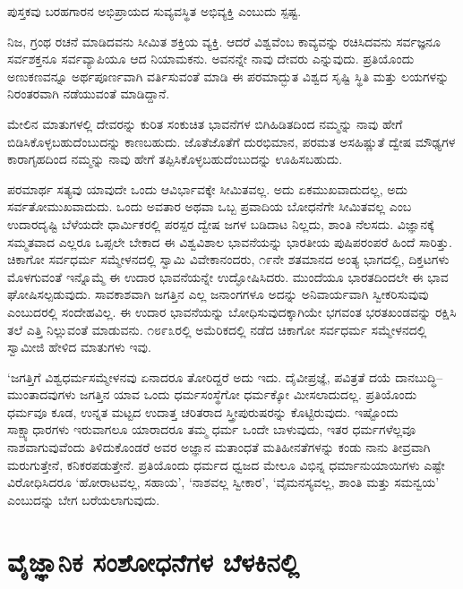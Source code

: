ಪುಸ್ತಕವು ಬರಹಗಾರನ ಅಭಿಪ್ರಾಯದ ಸುವ್ಯವಸ್ಥಿತ ಅಭಿವ್ಯಕ್ತಿ ಎಂಬುದು ಸ್ಪಷ್ಟ.

\newpage

ನಿಜ, ಗ್ರಂಥ ರಚನೆ ಮಾಡಿದವನು ಸೀಮಿತ ಶಕ್ತಿಯ ವ್ಯಕ್ತಿ. ಆದರೆ ವಿಶ್ವವೆಂಬ ಕಾವ್ಯವನ್ನು ರಚಿಸಿದವನು ಸರ್ವಜ್ಞನೂ ಸರ್ವಶಕ್ತನೂ ಸರ್ವವ್ಯಾಪಿಯೂ ಆದ ನಿಯಾಮಕನು. ಅವನನ್ನೇ ನಾವು ದೇವರು ಎನ್ನುವುದು. ಪ್ರತಿಯೊಂದು ಅಣುಕಣವನ್ನೂ ಅರ್ಥಪೂರ್ಣವಾಗಿ ವರ್ತಿಸುವಂತೆ ಮಾಡಿ ಈ ಪರಮಾದ್ಭುತ ವಿಶ್ವದ ಸೃಷ್ಟಿ ಸ್ಥಿತಿ ಮತ್ತು ಲಯಗಳನ್ನು ನಿರಂತರವಾಗಿ ನಡೆಯುವಂತೆ ಮಾಡಿದ್ದಾನೆ.

ಮೇಲಿನ ಮಾತುಗಳಲ್ಲಿ ದೇವರನ್ನು ಕುರಿತ ಸಂಕುಚಿತ ಭಾವನೆಗಳ ಬಿಗಿಹಿಡಿತದಿಂದ ನಮ್ಮನ್ನು ನಾವು ಹೇಗೆ ಬಿಡಿಸಿಕೊಳ್ಳಬಹುದೆಂಬುದನ್ನು ಕಾಣಬಹುದು. ಜೊತೆಜೊತೆಗೆ ದುರಭಿಮಾನ, ಪರಮತ ಅಸಹಿಷ್ಣುತೆ ದ್ವೇಷ ಮೌಢ್ಯಗಳ ಕಾರಾಗೃಹದಿಂದ ನಮ್ಮನ್ನು ನಾವು ಹೇಗೆ ತಪ್ಪಿಸಿಕೊಳ್ಳ\-ಬಹುದೆಂಬುದನ್ನು ಊಹಿಸಬಹುದು.

ಪರಮಾರ್ಥ ಸತ್ಯವು ಯಾವುದೇ ಒಂದು ಆವಿರ್ಭಾವಕ್ಕೇ ಸೀಮಿತವಲ್ಲ. ಅದು ಏಕಮುಖ\-ವಾದುದಲ್ಲ, ಅದು ಸರ್ವತೋಮುಖವಾದುದು. ಒಂದು ಅವತಾರ ಅಥವಾ ಒಬ್ಬ ಪ್ರವಾದಿಯ ಬೋಧನೆಗೇ ಸೀಮಿತವಲ್ಲ ಎಂಬ ಉದಾರದೃಷ್ಟಿ ಬೆಳೆಯದೇ ಧಾರ್ಮಿಕರಲ್ಲಿ ಪರಸ್ಪರ ದ್ವೇಷ ಜಗಳ ಬಡಿದಾಟ ನಿಲ್ಲದು, ಶಾಂತಿ ನೆಲಸದು. ವಿಜ್ಞಾನಕ್ಕೆ ಸಮ್ಮತವಾದ ಎಲ್ಲರೂ ಒಪ್ಪಲೇ ಬೇಕಾದ ಈ ವಿಶ್ವವಿಶಾಲ ಭಾವನೆಯನ್ನು ಭಾರತೀಯ ಪುಷಿಪರಂಪರೆ ಹಿಂದೆ ಸಾರಿತ್ತು. ಚಿಕಾಗೋ ಸರ್ವಧರ್ಮ ಸಮ್ಮೇಳನದಲ್ಲಿ ಸ್ವಾಮಿ ವಿವೇಕಾನಂದರು, ೧೯ನೇ ಶತಮಾನದ ಅಂತ್ಯ ಭಾಗದಲ್ಲಿ, ದಿಕ್ತಟಗಳು ಮೊಳಗುವಂತೆ ಇನ್ನೊಮ್ಮೆ ಈ ಉದಾರ ಭಾವನೆಯನ್ನೇ ಉದ್ಘೋಷಿಸಿದರು. ಮುಂದೆಯೂ ಭಾರತದಿಂದಲೇ ಈ ಭಾವ ಘೋಷಿಸಲ್ಪಡುವುದು. ಸಾವಕಾಶವಾಗಿ ಜಗತ್ತಿನ ಎಲ್ಲ ಜನಾಂಗಗಳೂ ಅದನ್ನು ಅನಿವಾರ್ಯವಾಗಿ ಸ್ವೀಕರಿಸುವುವು ಎಂಬುದರಲ್ಲಿ ಸಂದೇಹವಿಲ್ಲ. ಈ ಉದಾರ ಭಾವನೆಯನ್ನು ಬೋಧಿಸುವುದಕ್ಕಾಗಿಯೇ ಭಗವಂತ ಭರತಖಂಡವನ್ನು ರಕ್ಷಿಸಿ ತಲೆ ಎತ್ತಿ ನಿಲ್ಲುವಂತೆ ಮಾಡುವನು. ೧೮೯೩ರಲ್ಲಿ ಅಮೆರಿಕದಲ್ಲಿ ನಡೆದ ಚಿಕಾಗೋ ಸರ್ವಧರ್ಮ ಸಮ್ಮೇಳನದಲ್ಲಿ ಸ್ವಾಮೀಜಿ ಹೇಳಿದ ಮಾತುಗಳು ಇವು.

‘ಜಗತ್ತಿಗೆ ವಿಶ್ವಧರ್ಮಸಮ್ಮೇಳನವು ಏನಾದರೂ ತೋರಿದ್ದರೆ ಅದು ಇದು. ದೈವೀಪ್ರಜ್ಞೆ, ಪವಿತ್ರತೆ ದಯೆ ದಾನಬುದ್ಧಿ–ಮುಂತಾದವುಗಳು ಜಗತ್ತಿನ ಯಾವ ಒಂದು ಧರ್ಮಸಂಸ್ಥೆಗೋ ಧರ್ಮಕ್ಕೋ ಮೀಸಲಾದುದಲ್ಲ. ಪ್ರತಿಯೊಂದು ಧರ್ಮವೂ ಕೂಡ, ಉನ್ನತ ಮಟ್ಟದ ಉದಾತ್ತ ಚರಿತರಾದ ಸ್ತ್ರೀಪುರುಷರನ್ನು ಕೊಟ್ಟಿರುವುದು. ಇಷ್ಟೊಂದು ಸಾಕ್ಷ್ಯಾಧಾರಗಳು ಇರುವಾಗಲೂ ಯಾರಾದರೂ ತಮ್ಮ ಧರ್ಮ ಒಂದೇ ಬಾಳುವುದು, ಇತರ ಧರ್ಮಗಳೆಲ್ಲವೂ ನಾಶವಾಗುವುವೆಂದು ತಿಳಿದುಕೊಂಡರೆ ಅವರ ಅಜ್ಞಾನ ಮತಾಂಧತೆ ಮತಿಹೀನತೆಗಳನ್ನು ಕಂಡು ನಾನು ತೀವ್ರವಾಗಿ ಮರುಗುತ್ತೇನೆ, ಕನಿಕರಪಡುತ್ತೇನೆ. ಪ್ರತಿಯೊಂದು ಧರ್ಮದ ಧ್ವಜದ ಮೇಲೂ ವಿಭಿನ್ನ ಧರ್ಮಾನುಯಾಯಿಗಳು ಎಷ್ಟೇ ವಿರೋಧಿಸಿದರೂ ‘ಹೋರಾಟವಲ್ಲ, ಸಹಾಯ’, ‘ನಾಶವಲ್ಲ ಸ್ವೀಕಾರ’, ‘ವೈಮನಸ್ಯವಲ್ಲ, ಶಾಂತಿ ಮತ್ತು ಸಮನ್ವಯ’ ಎಂಬುದನ್ನು ಬೇಗ ಬರೆಯಲಾಗುವುದು.


\section*{ವೈಜ್ಞಾನಿಕ ಸಂಶೋಧನೆಗಳ ಬೆಳಕಿನಲ್ಲಿ}


